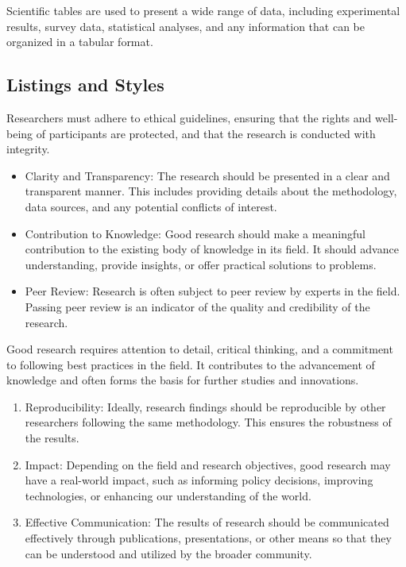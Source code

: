 \documentclass[sigconf, nonacm]{acmart}
\begin{document}
Scientific tables are used to present a wide range of data, including experimental results, survey data, statistical analyses, and any information that can be organized in a tabular format.

\subsection{Listings and Styles}

Researchers must adhere to ethical guidelines, ensuring that the rights and well-being of participants are protected, and that the research is conducted with integrity.

\begin{itemize}
\item Clarity and Transparency: The research should be presented in a clear and transparent manner. This includes providing details about the methodology, data sources, and any potential conflicts of interest.
\item Contribution to Knowledge: Good research should make a meaningful contribution to the existing body of knowledge in its field. It should advance understanding, provide insights, or offer practical solutions to problems.
\item Peer Review: Research is often subject to peer review by experts in the field. Passing peer review is an indicator of the quality and credibility of the research.
\end{itemize}

Good research requires attention to detail, critical thinking, and a commitment to following best practices in the field. It contributes to the advancement of knowledge and often forms the basis for further studies and innovations.

\begin{enumerate}
\item Reproducibility: Ideally, research findings should be reproducible by other researchers following the same methodology. This ensures the robustness of the results.
\item Impact: Depending on the field and research objectives, good research may have a real-world impact, such as informing policy decisions, improving technologies, or enhancing our understanding of the world.
\item Effective Communication: The results of research should be communicated effectively through publications, presentations, or other means so that they can be understood and utilized by the broader community.
\end{enumerate}
\end{document}
